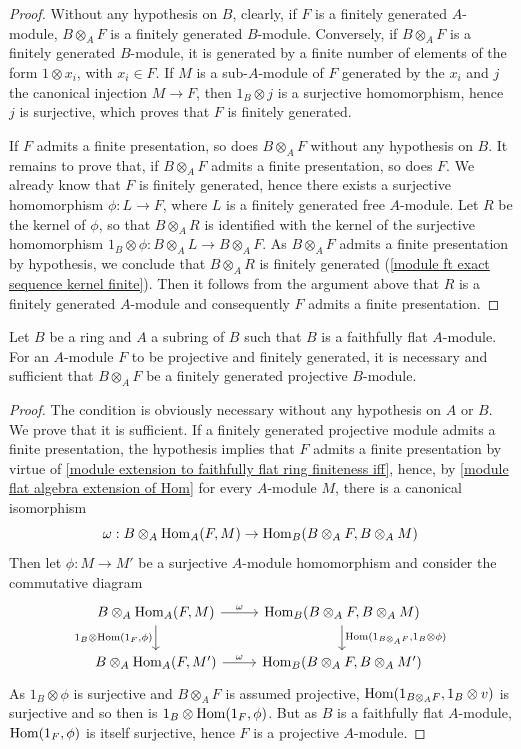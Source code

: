 \begin{proof}
Without any hypothesis on $B$, clearly, if $F$ is a finitely generated $A$-module, $B\otimes_AF$ is a finitely generated $B$-module. Conversely, if $B\otimes_AF$ is a finitely generated $B$-module, it is generated by a finite number of elements of the form $1\otimes x_i$, with $x_i\in F$. If $M$ is a sub-$A$-module of $F$ generated by the $x_i$ and $j$ the canonical injection $M\to F$, then $1_B\otimes j$ is a surjective homomorphism, hence $j$ is surjective, which proves that $F$ is finitely generated.\par
If $F$ admits a finite presentation, so does $B\otimes_AF$ without any hypothesis on $B$. It remains to prove that, if $B\otimes_AF$ admits a finite presentation, so does $F$. We already know that $F$ is finitely generated, hence there exists a surjective homomorphism $\phi:L\to F$, where $L$ is a finitely generated free $A$-module. Let $R$ be the kernel of $\phi$, so that $B\otimes_AR$ is identified with the kernel of the surjective homomorphism $1_B\otimes\phi:B\otimes_AL\to B\otimes_AF$. As $B\otimes_AF$ admits a finite presentation by hypothesis, we conclude that $B\otimes_AR$ is finitely generated (\cref{module ft exact sequence kernel finite}). Then it follows from the argument above that $R$ is a finitely generated $A$-module and consequently $F$ admits a finite presentation.
\end{proof}
\begin{proposition}\label{module extension to faithfully flat finite projective iff}
Let $B$ be a ring and $A$ a subring of $B$ such that $B$ is a faithfully flat $A$-module. For an $A$-module $F$ to be projective and finitely generated, it is necessary and sufficient that $B\otimes_AF$ be a finitely generated projective $B$-module.
\end{proposition}
\begin{proof}
The condition is obviously necessary without any hypothesis on $A$ or $B$. We prove that it is sufficient. If a finitely generated projective module admits a finite presentation, the hypothesis implies that $F$ admits a finite presentation by virtue of \cref{module extension to faithfully flat ring finiteness iff}, hence, by \cref{module flat algebra extension of Hom} for every $A$-module $M$, there is a canonical isomorphism
\[\omega:B\otimes_A\mathrm{Hom}_A(F,M)\to \mathrm{Hom}_B(B\otimes_AF,B\otimes_AM)\]
Then let $\phi:M\to M'$ be a surjective $A$-module homomorphism and consider the commutative diagram
\[\begin{tikzcd}
B\otimes_A\Hom_A(F,M)\ar[r,"\omega"]\ar[d,swap,"{1_B\otimes\Hom(1_F,\phi)}"]&\Hom_B(B\otimes_AF,B\otimes_AM)\ar[d,"{\Hom(1_{B\otimes_AF},1_B\otimes\phi)}"]\\
B\otimes_A\Hom_A(F,M')\ar[r,"\omega"]&\Hom_B(B\otimes_AF,B\otimes_AM')
\end{tikzcd}\]
As $1_B\otimes\phi$ is surjective and $B\otimes_AF$ is assumed projective, $\mathrm{Hom}(1_{B\otimes_AF},1_B\otimes v)$ is surjective and so then is $1_B\otimes\mathrm{Hom}(1_F,\phi)$. But as $B$ is a faithfully flat $A$-module, $\mathrm{Hom}(1_F,\phi)$ is itself surjective, hence $F$ is a projective $A$-module.
\end{proof}
